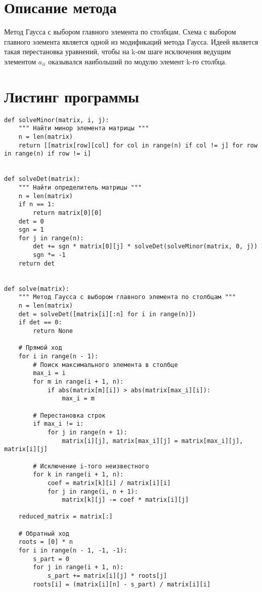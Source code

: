 \documentclass[12pt]{report}
\begin{document}
\section*{Описание метода}
Метод Гаусса с выбором главного элемента по столбцам.
Схема с выбором главного элемента является одной из модификаций метода Гаусса. Идеей является такая перестановка уравнений, чтобы на k-ом шаге исключения ведущим элементом $a_{ii}$ оказывался наибольший по модулю элемент k-го столбца.

\section*{Листинг программы}
\begin{lstlisting}[style=pythonstyle]
def solveMinor(matrix, i, j):
    """ Найти минор элемента матрицы """
    n = len(matrix)
    return [[matrix[row][col] for col in range(n) if col != j] for row in range(n) if row != i]


def solveDet(matrix):
    """ Найти определитель матрицы """
    n = len(matrix)
    if n == 1:
        return matrix[0][0]
    det = 0
    sgn = 1
    for j in range(n):
        det += sgn * matrix[0][j] * solveDet(solveMinor(matrix, 0, j))
        sgn *= -1
    return det


def solve(matrix):
    """ Метод Гаусса с выбором главного элемента по столбцам """
    n = len(matrix)
    det = solveDet([matrix[i][:n] for i in range(n)])
    if det == 0:
        return None

    # Прямой ход
    for i in range(n - 1):
        # Поиск максимального элемента в столбце
        max_i = i
        for m in range(i + 1, n):
            if abs(matrix[m][i]) > abs(matrix[max_i][i]):
                max_i = m

        # Перестановка строк
        if max_i != i:
            for j in range(n + 1):
                matrix[i][j], matrix[max_i][j] = matrix[max_i][j], matrix[i][j]

        # Исключение i-того неизвестного
        for k in range(i + 1, n):
            coef = matrix[k][i] / matrix[i][i]
            for j in range(i, n + 1):
                matrix[k][j] -= coef * matrix[i][j]

    reduced_matrix = matrix[:]

    # Обратный ход
    roots = [0] * n
    for i in range(n - 1, -1, -1):
        s_part = 0
        for j in range(i + 1, n):
            s_part += matrix[i][j] * roots[j]
        roots[i] = (matrix[i][n] - s_part) / matrix[i][i]


\end{lstlisting}
\end{document}
